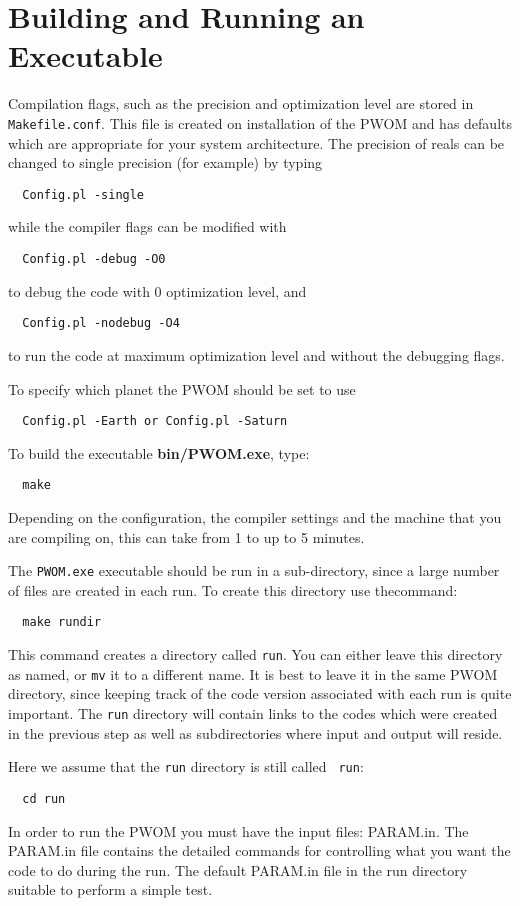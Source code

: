 \section{Building and Running an Executable}


Compilation flags, such as the precision and optimization 
level are stored in {\tt Makefile.conf}. This file is created on
installation of the PWOM and has defaults which are appropriate for
your system architecture.  The precision of reals
can be changed to single precision (for example) by typing
\begin{verbatim}
  Config.pl -single
\end{verbatim}
while the compiler flags can be modified with
\begin{verbatim}
  Config.pl -debug -O0
\end{verbatim}
to debug the code with 0 optimization level, and
\begin{verbatim}
  Config.pl -nodebug -O4
\end{verbatim}
to run the code at maximum optimization level and without the debugging flags.

To specify which planet the PWOM should be set to use 
\begin{verbatim}
  Config.pl -Earth or Config.pl -Saturn
\end{verbatim}


To build the executable {\bf bin/PWOM.exe}, type:
\begin{verbatim}
  make
\end{verbatim} 
Depending on the configuration, the compiler settings and the machine 
that you are compiling on, this can take from 1 to up to 5 minutes.  

The {\tt PWOM.exe} executable should be run in a sub-directory, since a 
large number of files are created in each run.  
To create this directory use thecommand:
\begin{verbatim}
  make rundir
\end{verbatim} 
This command creates a directory called {\tt run}.  You can either
leave this directory as named, or {\tt mv} it to a different name.  It
is best to leave it in the same PWOM directory, since
keeping track of the code version associated with each run is quite
important.  The {\tt run} directory will contain links to the codes
which were created in the previous step as well as subdirectories
where input and output will reside.

Here we assume that the {\tt run} directory is still called {\tt
run}:
\begin{verbatim}
  cd run
\end{verbatim}
In order to run the PWOM you must have the input files: 
PARAM.in. The PARAM.in 
file contains the detailed commands for controlling what you want the
code to do during the run.  The default PARAM.in 
file in the run directory  suitable to perform a simple test.

